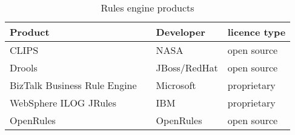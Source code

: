 \begin{table}
    \begin{center}
        \begin{tabular}{ |l c |l|l| } 
            \hline
            Product                      &                             & Developer    & licence type   \\
            \hline
            CLIPS                        &\cite{CLIPSProductPage}      & NASA         & open source    \\ 
            Drools                       &\cite{DroolsProductPage}     & JBoss/RedHat & open source    \\ 
            BizTalk Business Rule Engine &\cite{BiztalkProductPage}    & Microsoft    & proprietary    \\ 
            WebSphere ILOG JRules        &\cite{JRulesProductPage}     & IBM          & proprietary    \\ 
            OpenRules                    &\cite{OpenRulesProductPage}  & OpenRules    & open source    \\ 
            \hline
        \end{tabular}
    \end{center}
    \caption{Rules engine products}
    \label{table:RuleEngines}
\end{table}



